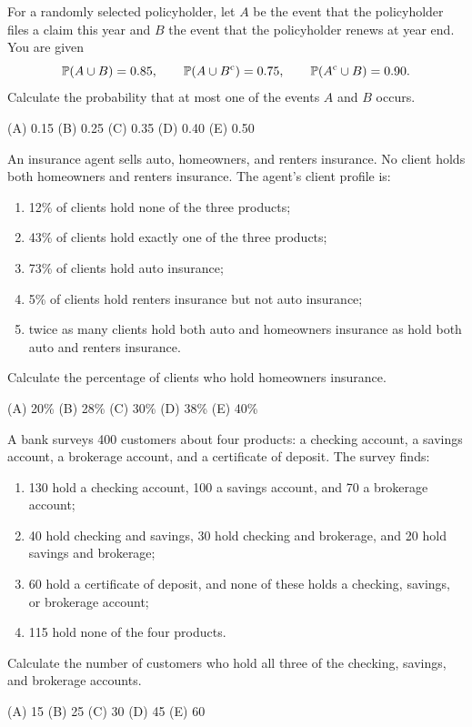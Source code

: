 \begin{practice}
For a randomly selected policyholder, let $A$ be the event that the policyholder
files a claim this year and $B$ the event that the policyholder renews at year end.
You are given
\[
  \mathbb{P}(A \cup B) = 0.85, \qquad \mathbb{P}(A \cup B^{\mathrm{c}}) = 0.75, \qquad \mathbb{P}(A^{\mathrm{c}} \cup B) = 0.90 .
\]
Calculate the probability that at most one of the events $A$ and $B$ occurs.

(A) 0.15 \qquad (B) 0.25 \qquad (C) 0.35 \qquad (D) 0.40 \qquad (E) 0.50
\end{practice}

\begin{practice}
An insurance agent sells auto, homeowners, and renters insurance. No client holds
both homeowners and renters insurance. The agent's client profile is:
\begin{enumerate}[nosep,label=(\roman*)]
  \item 12\% of clients hold none of the three products;
  \item 43\% of clients hold exactly one of the three products;
  \item 73\% of clients hold auto insurance;
  \item 5\% of clients hold renters insurance but not auto insurance;
  \item twice as many clients hold both auto and homeowners insurance as hold both
        auto and renters insurance.
\end{enumerate}
Calculate the percentage of clients who hold homeowners insurance.

(A) 20\% \qquad (B) 28\% \qquad (C) 30\% \qquad (D) 38\% \qquad (E) 40\%
\end{practice}

\begin{practice}
A bank surveys 400 customers about four products: a checking account, a savings
account, a brokerage account, and a certificate of deposit. The survey finds:
\begin{enumerate}[nosep,label=(\roman*)]
  \item 130 hold a checking account, 100 a savings account, and 70 a brokerage
        account;
  \item 40 hold checking and savings, 30 hold checking and brokerage, and 20 hold
        savings and brokerage;
  \item 60 hold a certificate of deposit, and none of these holds a checking,
        savings, or brokerage account;
  \item 115 hold none of the four products.
\end{enumerate}
Calculate the number of customers who hold all three of the checking, savings, and
brokerage accounts.

(A) 15 \qquad (B) 25 \qquad (C) 30 \qquad (D) 45 \qquad (E) 60
\end{practice}


